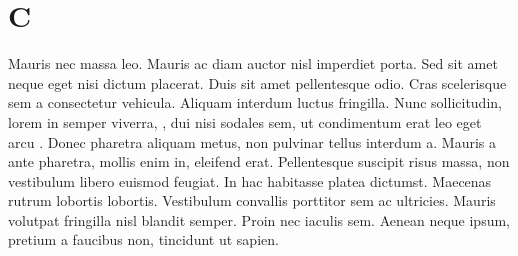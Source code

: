 \section {C}
Mauris nec massa leo. Mauris ac diam auctor nisl imperdiet porta. Sed sit amet neque eget nisi dictum placerat. Duis sit amet pellentesque odio. Cras scelerisque sem a consectetur vehicula. Aliquam interdum luctus fringilla. Nunc sollicitudin, lorem in semper viverra, \citet{Goldreich_1990}, dui nisi sodales sem, ut condimentum erat leo eget arcu \citep{Goldreich_1990,Kumar_1994}. Donec pharetra aliquam metus, non pulvinar tellus interdum a. Mauris a ante pharetra, mollis enim in, eleifend erat. Pellentesque suscipit risus massa, non vestibulum libero euismod feugiat. In hac habitasse platea dictumst. Maecenas rutrum lobortis lobortis. Vestibulum convallis porttitor sem ac ultricies. Mauris volutpat fringilla nisl blandit semper. Proin nec iaculis sem. Aenean neque ipsum, pretium a faucibus non, tincidunt ut sapien.
